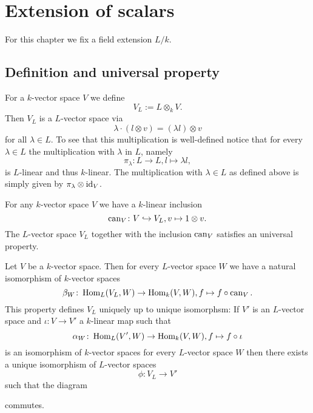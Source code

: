 \chapter{Extension of scalars}
For this chapter we fix a field extension $L/k$.




\section{Definition and universal property}


For a $k$-vector space $V$ we define
\[
 V_L := L \otimes_k V.
\]
Then $V_L$ is a $L$-vector space via
\[
 \lambda \cdot (l \otimes v) = (\lambda l) \otimes v
\]
for all $\lambda \in L$. To see that this multiplication is well-defined notice that for every $\lambda \in L$ the multiplication with $\lambda$ in $L$, namely
\[
 \pi_\lambda \colon L \to L, l \mapsto \lambda l,
\]
is $L$-linear and thus $k$-linear. The multiplication with $\lambda \in L$ as defined above is simply given by $\pi_\lambda \otimes \operatorname{id}_V$.

For any $k$-vector space $V$ we have a $k$-linear inclusion
\[
 \operatorname{can}_V \colon V \hookrightarrow V_L, v \mapsto 1 \otimes v.
\]
The $L$-vector space $V_L$ together with the inclusion $\operatorname{can}_V$ satisfies an universal property.


\begin{thrm}
 Let $V$ be a $k$-vector space. Then for every $L$-vector space $W$ we have a natural isomorphism of $k$-vector spaces
 \[
  \beta_W \colon \operatorname{Hom}_L(V_L, W) \to \operatorname{Hom}_k(V,W), f \mapsto f \circ \operatorname{can}_V.
 \]
 This property defines $V_L$ uniquely up to unique isomorphsm: If $V'$ is an $L$-vector space and $\iota \colon V \to V'$ a $k$-linear map such that
 \[
  \alpha_W \colon \operatorname{Hom}_L(V', W) \to \operatorname{Hom}_k(V,W), f \mapsto f \circ \iota
 \]
 is an isomorphism of $k$-vector spaces for every $L$-vector space $W$ then there exists a unique isomorphism of $L$-vector spaces
 \[
  \phi \colon V_L \to V'
 \]
 such that the diagram
 \begin{center}
 \end{center}
 commutes.
\end{thrm}


